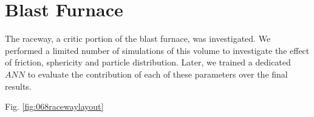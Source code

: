 
\chapter{Blast Furnace}
\label{cap:blastfurnace}

The raceway, a critic portion of the blast furnace, was investigated. We
performed a limited number of simulations of this volume to investigate the
effect of friction, sphericity and particle distribution.
Later, we trained a dedicated $ANN$ to evaluate the contribution of each of
these parameters over the final results.

Fig. \ref{fig:068racewaylayout}
